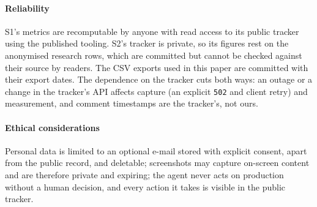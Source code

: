 \paragraph{Reliability}
S1's metrics are recomputable by anyone with read access to its public tracker using the published tooling. S2's tracker is private, so its figures rest on the anonymised research rows, which are committed but cannot be checked against their source by readers. The CSV exports used in this paper are committed with their export dates. The dependence on the tracker cuts both ways: an outage or a change in the tracker's API affects capture (an explicit \texttt{502} and client retry) and measurement, and comment timestamps are the tracker's, not ours.

\paragraph{Ethical considerations}
Personal data is limited to an optional e-mail stored with explicit consent, apart from the public record, and deletable; screenshots may capture on-screen content and are therefore private and expiring; the agent never acts on production without a human decision, and every action it takes is visible in the public tracker.
